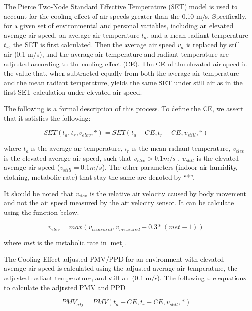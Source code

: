 The Pierce Two-Node Standard Effective Temperature (SET) model is used to account for the cooling effect of air speeds greater than the 0.10 m/s. Specifically, for a given set of environmental and personal variables, including an elevated average air speed, an average air temperature \(t_{a}\), and a mean radiant temperature \(t_{r}\), the SET is first calculated. Then the average air speed \(v_{a}\) is replaced by still air (0.1 m/s), and the average air temperature and radiant temperature are adjusted according to the cooling effect (CE). The CE of the elevated air speed is the value that, when subtracted equally from both the average air temperature and the mean radiant temperature, yields the same SET under still air as in the first SET calculation under elevated air speed.

The following is a formal description of this process. To define the CE, we assert that it satisfies the following:

\begin{equation}
SET(t_{a}, t_{r}, v_{elev}, *) = SET(t_{a} - CE, t_{r} - CE, v_{still}, *) 
\end{equation}

where \(t_{a}\) is the average air temperature, \(t_{r}\) is the mean radiant temperature, \(v_{elev}\) is the elevated average air speed, such that \(v_{elev} > 0.1 m/s\) , \(v_{still}\) is the elevated average air speed (\(v_{still} = 0.1 m/s\)). The other parameters (indoor air humidity, clothing, metabolic rate) that stay the same are denoted by “*”.

It should be noted that \(v_{elev}\) is the relative air velocity caused by body movement and not the air speed measured by the air velocity sensor. It can be calculate using the function below.

\begin{equation}
v_{elev} = max(v_{measured}, v_{measured} + 0.3 * (met - 1))
\end{equation}

where \(met\) is the metabolic rate in [met].

The Cooling Effect adjusted PMV/PPD for an environment with elevated average air speed is calculated using the adjusted average air temperature, the adjusted radiant temperature, and still air (0.1 m/s). The following are equations to calculate the adjusted PMV and PPD.

\begin{equation}
PMV_{adj} = PMV(t_{a} - CE, t_{r} - CE, v_{still}, *)
\end{equation}

